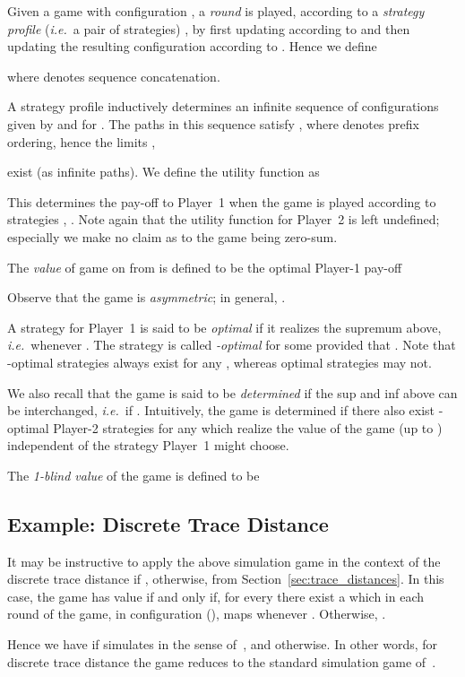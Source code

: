 \documentclass[copyright,creativecommons,sharealike]{eptcs}
\theoremstyle{plain}
\newcommand*\ie{\textit{i.e.}}
\begin{document}
Given a game with configuration , a \emph{round} is
played, according to a \emph{strategy profile} (\ie~a pair of
strategies) , by
first updating  according to  and then updating the
resulting configuration according to .  Hence we define

where  denotes sequence concatenation.

A strategy profile 
inductively determines an infinite sequence  of configurations given by  and  for .  The
paths in this sequence satisfy ,
where  denotes prefix ordering, hence the limits ,

exist (as infinite paths).
We define the utility function  as

This determines the pay-off to Player~1 when the game is played
according to strategies , .  Note again that the
utility function for Player~2 is left undefined; especially we make no
claim as to the game being zero-sum.

The \emph{value} of game on  from  is defined to be
the optimal Player-1 pay-off

Observe that the game is \emph{asymmetric}; in general, .  

A strategy  for Player~1 is said to be \emph{optimal}
if it realizes the supremum above, \ie~whenever . The strategy is
called \emph{-optimal} for some  provided that
.  Note that -optimal strategies always
exist for any , whereas optimal strategies may not.

We also recall that the game is said to be \emph{determined} if the
sup and inf above can be interchanged, \ie~if .  Intuitively, the game is determined if there also exist
-optimal Player-2 strategies for any  which
realize the value of the game (up to ) independent of the
strategy Player~1 might choose.

The \emph{1-blind value} of the game is defined to be


\subsection{Example: Discrete Trace Distance}
\label{se:discrete}

It may be instructive to apply the above simulation game in the
context of the discrete trace distance  if
,  otherwise, from
Section~\ref{sec:trace_distances}.  In this case, the game has value
 if and only if, for every  there
exist a  which in each round  of the
game, in configuration (), maps
 whenever
.  Otherwise,
.

Hence we have  if  simulates  in the sense
of~\cite{milner89}, and  otherwise.  In other
words, for discrete trace distance the game reduces to the standard
simulation game of~\cite{DBLP:conf/banff/Stirling95}.
\end{document}

